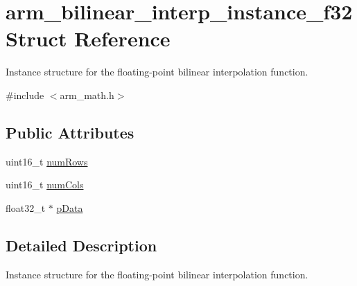 \hypertarget{structarm__bilinear__interp__instance__f32}{\section{arm\-\_\-bilinear\-\_\-interp\-\_\-instance\-\_\-f32 Struct Reference}
\label{structarm__bilinear__interp__instance__f32}
}


Instance structure for the floating-\/point bilinear interpolation function.  




{\ttfamily \#include $<$arm\-\_\-math.\-h$>$}

\subsection*{Public Attributes}
\begin{DoxyCompactItemize}
\item 
uint16\-\_\-t \hyperlink{structarm__bilinear__interp__instance__f32_a34f2b17cc57b95011960df9718af6ed6}{num\-Rows}
\item 
uint16\-\_\-t \hyperlink{structarm__bilinear__interp__instance__f32_aede17bebfb1f835b61d71dd813eab3f8}{num\-Cols}
\item 
float32\-\_\-t $\ast$ \hyperlink{structarm__bilinear__interp__instance__f32_afd1e764591c991c212d56c893efb5ea4}{p\-Data}
\end{DoxyCompactItemize}


\subsection{Detailed Description}
Instance structure for the floating-\/point bilinear interpolation function. 


